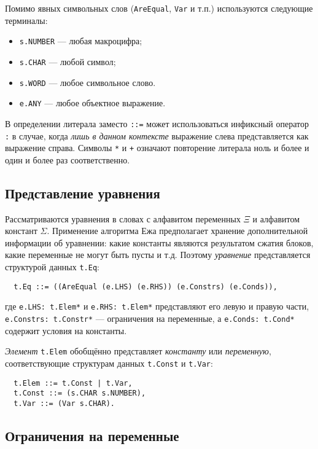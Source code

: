 \documentclass[12pt]{article}
\begin{document}
Помимо явных символьных слов (\texttt{AreEqual}, \texttt{Var} и т.п.)
используются следующие терминалы:
\begin{itemize}
  \item \texttt{s.NUMBER} --- любая макроцифра; 
  \item \texttt{s.CHAR} --- любой символ; 
  \item \texttt{s.WORD} --- любое символьное слово.
  \item \texttt{e.ANY} --- любое объектное выражение.
\end{itemize}
В определении литерала заместо \texttt{::=} может использоваться инфиксный
оператор \texttt{:} в случае, когда \textit{лишь в данном контексте}
выражение слева представляется как выражение справа. Символы \texttt{*} и
\texttt{+} означают повторение литерала ноль и более и один и более раз
соответственно.


\subsection{Представление уравнения}

Рассматриваются уравнения в словах с алфавитом переменных $\Xi$ и алфавитом
констант $\Sigma$. Применение алгоритма Ежа предполагает хранение
дополнительной информации об уравнении: какие константы являются результатом
сжатия блоков, какие переменные не могут быть пусты и т.д. Поэтому
\textit{уравнение} представляется структурой данных \texttt{t.Eq}:
\begin{Verbatim}
  t.Eq ::= ((AreEqual (e.LHS) (e.RHS)) (e.Constrs) (e.Conds)),
\end{Verbatim}
где \texttt{e.LHS: t.Elem*} и \texttt{e.RHS: t.Elem*} представляют его левую и
правую части, \texttt{e.Constrs: t.Constr*} --- ограничения на переменные,
а \texttt{e.Conds: t.Cond*} содержит условия на константы.

\textit{Элемент} \texttt{t.Elem} обобщённо представляет \textit{константу} или
\textit{переменную}, соответствующие структурам данных \texttt{t.Const} и
\texttt{t.Var}:
\begin{Verbatim}
  t.Elem ::= t.Const | t.Var,
  t.Const ::= (s.CHAR s.NUMBER),
  t.Var ::= (Var s.CHAR).
\end{Verbatim}


\subsection{Ограничения на переменные}
\end{document}
